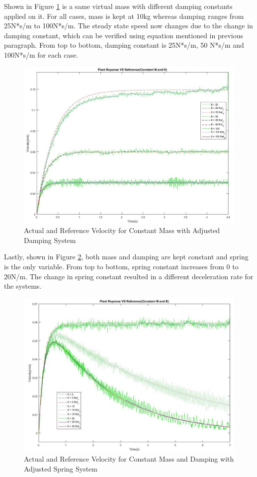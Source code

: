 Shown in Figure \ref{fig:BChange} is a same virtual mass with different damping constants applied on it. For all cases, mass is kept at 10kg whereas damping ranges from 25N*s/m to 100N*s/m. The steady state speed now changes due to the change in damping constant, which can be verified using equation mentioned in previous paragraph. From top to bottom, damping constant is 25N*s/m, 50 N*s/m and 100N*s/m for each case. 
\begin{figure}
\centering
\includegraphics[width=1\linewidth]{Images/BChange}
\caption{Actual and Reference Velocity for Constant Mass with Adjusted Damping System}
\label{fig:BChange}
\end{figure}

Lastly, shown in Figure \ref{fig:KChange}, both mass and damping are kept constant and spring is the only variable. From top to bottom, spring constant increases from 0 to 20N/m. The change in spring constant resulted in a different deceleration rate for the systems. 
\begin{figure}[H]
\centering
\includegraphics[width=1\linewidth]{Images/KChange}
\caption{Actual and Reference Velocity for Constant Mass and Damping with Adjusted Spring System}
\label{fig:KChange}
\end{figure}

